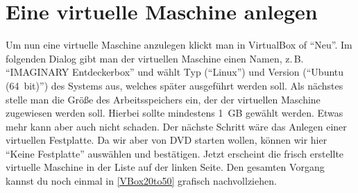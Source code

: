\documentclass[a4paper,10pt,BCOR=0mm,DIV=14]{scrartcl}
\newcommand{\command}[1]{\textsf{\enquote{#1}}}
\begin{document}
\section{Eine virtuelle Maschine anlegen}
Um nun eine virtuelle Maschine anzulegen klickt man in VirtualBox of \command{Neu}. Im folgenden Dialog gibt man der virtuellen Maschine einen Namen, z.\,B. \command{IMAGINARY Entdeckerbox} und wählt Typ (\command{Linux}) und Version (\command{Ubuntu (64\, bit)}) des Systems aus, welches später ausgeführt werden soll. Als nächstes stelle man die Größe des Arbeitsspeichers ein, der der virtuellen Maschine zugewiesen werden soll. Hierbei sollte mindestens 1\, GB gewählt werden. Etwas mehr kann aber auch nicht schaden. Der nächste Schritt wäre das Anlegen einer virtuellen Festplatte. Da wir aber von DVD starten wollen, können wir hier \command{Keine Festplatte} auswählen und bestätigen. Jetzt erscheint die frisch erstellte virtuelle Maschine in der Liste auf der linken Seite. Den gesamten Vorgang kannst du noch einmal in \cref{VBox20to50} grafisch nachvollziehen.
\end{document}
